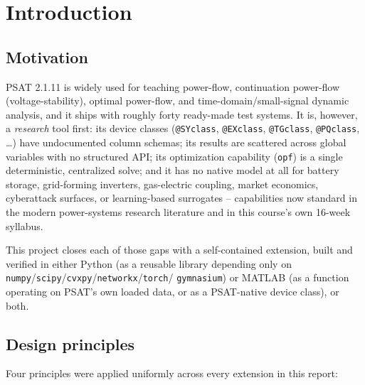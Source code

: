 \documentclass[11pt]{report}
\newcommand{\pkg}[1]{\texttt{#1}}
\theoremstyle{plain}
\theoremstyle{definition}
\theoremstyle{remark}
\begin{document}
\tableofcontents

\chapter{Introduction}

\section{Motivation}

PSAT 2.1.11 is widely used for teaching power-flow, continuation
power-flow (voltage-stability), optimal power-flow, and
time-domain/small-signal dynamic analysis, and it ships with roughly
forty ready-made test systems. It is, however, a \emph{research} tool
first: its device classes (\pkg{@SYclass}, \pkg{@EXclass},
\pkg{@TGclass}, \pkg{@PQclass}, \ldots) have undocumented column
schemas; its results are scattered across global variables with no
structured API; its optimization capability (\texttt{opf}) is a single
deterministic, centralized solve; and it has no native model at all for
battery storage, grid-forming inverters, gas-electric coupling, market
economics, cyberattack surfaces, or learning-based surrogates --
capabilities now standard in the modern power-systems research
literature and in this course's own 16-week syllabus.

This project closes each of those gaps with a self-contained extension,
built and verified in either Python (as a reusable library depending
only on \pkg{numpy}/\pkg{scipy}/\pkg{cvxpy}/\pkg{networkx}/\pkg{torch}/
\pkg{gymnasium}) or MATLAB (as a function operating on PSAT's own loaded
data, or as a PSAT-native device class), or both.

\section{Design principles}

Four principles were applied uniformly across every extension in this
report:
\end{document}
